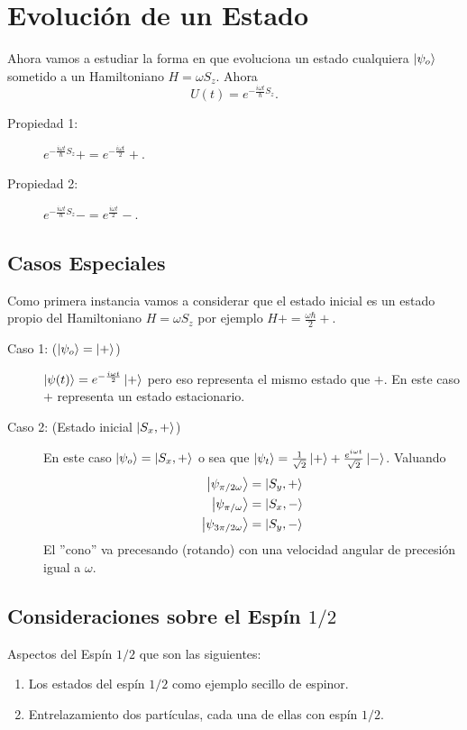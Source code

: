 \section{Evolución de un Estado}
Ahora vamos a estudiar la forma en que evoluciona un estado cualquiera $\ket{\psi_{o} }$ sometido a un Hamiltoniano $H = \omega S_z$. Ahora
\begin{equation}
	U(t) = e^{-\frac{i\omega t}{\hbar} S_z}.
\end{equation}

\begin{description}
	\item[Propiedad 1: ] $e^{-\frac{i\omega t}{\hbar} S_z} \plus = e^{-\frac{i\omega t}{2}} \plus$.
	\item[Propiedad 2: ] $e^{-\frac{i\omega t}{\hbar} S_z} \minus = e^{\frac{i\omega t}{2}} \minus$.
\end{description}




\subsection{Casos Especiales}
Como primera instancia vamos a considerar que el estado inicial es un estado propio del Hamiltoniano $H = \omega S_z$ por ejemplo $H\plus = \frac{\omega \hbar}{2} \plus$.

\begin{description}
	\item[Caso 1: ($\ket{\psi_{o} } = \ket{+}$)] $\ket{\psi (t)} = e^{-\frac{i\omega t}{2}} \ket{+}$ pero eso representa el mismo estado que $\plus$. En este caso $\plus$ representa un estado estacionario.  
	\item[Caso 2: (Estado inicial $\ket{S_{x} ,+}$)] En este caso $\ket{\psi_{o} } = \ket{S_{x} ,+}$ o sea que $\ket{\psi_{t} } = \frac{1}{\sqrt{2}} \ket{+} + \frac{e^{i\omega t}}{\sqrt{2}} \ket{-}$. Valuando
		\begin{align*}
			\ket{\psi_{\pi /2\omega} } &= \ket{S_{y} ,+} \\
			\ket{\psi_{\pi /\omega} } &= \ket{S_{x} ,-} \\
			\ket{\psi_{3\pi / 2\omega} } &= \ket{S_{y} ,-}
		\end{align*}
	El ''cono'' va precesando (rotando) con una velocidad angular de precesión igual a $\omega$.
\end{description}


\subsection{Consideraciones sobre el Espín $1/2$}
Aspectos del Espín $1/2$ que son las siguientes:
\begin{enumerate}
	\item Los estados del espín $1/2$ como ejemplo secillo de espinor.
	\item Entrelazamiento dos partículas, cada una de ellas con espín $1/2$.
\end{enumerate}


